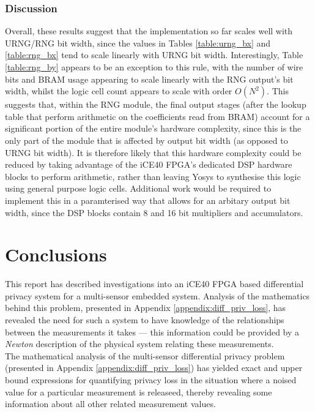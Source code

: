 \documentclass[12pt]{article}
\begin{document}
    \subsubsection{Discussion}
      Overall, these results suggest that the implementation so far scales well with URNG/RNG bit width, since the values in Tables \ref{table:urng_bx} and \ref{table:rng_bx} tend to scale linearly with URNG bit width. Interestingly, Table \ref{table:rng_by} appears to be an exception to this rule, with the number of wire bits and BRAM usage appearing to scale linearly with the RNG output's bit width, whilst the logic cell count appears to scale with order $O(N^2)$. This suggests that, within the RNG module, the final output stages (after the lookup table that perform arithmetic on the coefficients read from BRAM) account for a significant portion of the entire module's hardware complexity, since this is the only part of the module that is affected by output bit width (as opposed to URNG bit width). It is therefore likely that this hardware complexity could be reduced by taking advantage of the iCE40 FPGA's dedicated DSP hardware blocks to perform arithmetic, rather than leaving Yosys to synthesise this logic using general purpose logic cells. Additional work would be required to implement this in a paramterised way that allows for an arbitary output bit width, since the DSP blocks contain 8 and 16 bit multipliers and accumulators.
\newpage

%
%

\section{Conclusions}
  This report has described investigations into an iCE40 FPGA based differential privacy system for a multi-sensor embedded system. Analysis of the mathematics behind this problem, presented in Appendix \ref{appendix:diff_priv_loss}, has revealed the need for such a system to have knowledge of the relationships between the measurements it takes --- this information could be provided by a \textit{Newton} description of the physical system relating these measurements.\\

  The mathematical analysis of the multi-sensor differential privacy problem (presented in Appendix \ref{appendix:diff_priv_loss}) has yielded exact and upper bound expressions for quantifying privacy loss in the situation where a noised value for a particular measurement is releaseed, thereby revealing some information about all other related measurement values.\\
\end{document}
